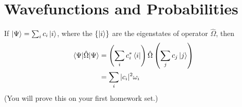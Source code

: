 %
%
%

\section*{Wavefunctions and Probabilities}
	
	If $\ket{\Psi} = \sum_i c_i \ket{i}$, where the $\{\ket{i}\}$ are the eigenstates of operator $\hat\Omega$, then
	\begin{align*}
		\braket{\Psi|\hat\Omega|\Psi} &= \left(\sum_i c_i^* \bra{i}\right) \hat\Omega \left(\sum_j c_j \ket{j}\right)\\
			&= \sum_i |c_i|^2 \omega_i
	\end{align*}
	(You will prove this on your first homework set.)
	
